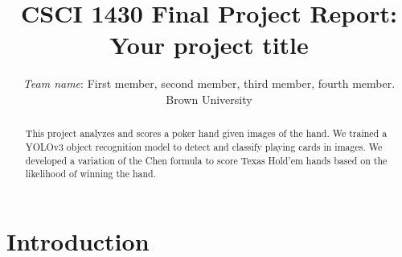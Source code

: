 \documentclass[10pt,twocolumn,letterpaper]{article}
\begin{document}
\title{CSCI 1430 Final Project Report:\\Your project title}

\author{\emph{Team name}: First member, second member, third member, fourth member.\\
Brown University\\
}

\maketitle

\begin{abstract}
This project analyzes and scores a poker hand given images of the hand. We trained a YOLOv3 object recognition model to detect and classify playing cards in images. We developed a variation of the Chen formula to score Texas Hold'em hands based on the likelihood of winning the hand.
\end{abstract}





\section{Introduction}
\end{document}
